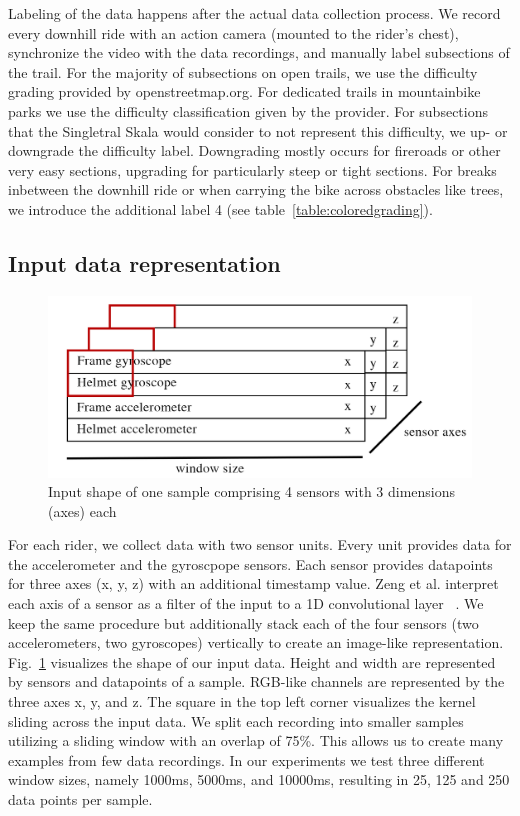 \documentclass[runningheads]{llncs}
\begin{document}
Labeling of the data happens after the actual data collection process.
We record every downhill ride with an action camera (mounted to the rider's chest), synchronize the video with the data recordings, and manually label subsections of the trail.
For the majority of subsections on open trails, we use the difficulty grading provided by openstreetmap.org.
For dedicated trails in mountainbike parks we use the difficulty classification given by the provider.
For subsections that the Singletral Skala would consider to not represent this difficulty, we up- or downgrade the difficulty label.
Downgrading mostly occurs for fireroads or other very easy sections, upgrading for particularly steep or tight sections.
For breaks inbetween the downhill ride or when carrying the bike across obstacles like trees, we introduce the additional label 4 (see table~\ref{table:coloredgrading}).

\subsection{Input data representation}

\begin{figure}
\includegraphics[width=\textwidth]{input_shape.png}
\caption{Input shape of one sample comprising 4 sensors with 3 dimensions (axes) each}
\label{fig2}	
\end{figure}

For each rider, we collect data with two sensor units.
Every unit provides data for the accelerometer and the gyroscpope sensors.
Each sensor provides datapoints for three axes (x, y, z) with an additional timestamp value.
Zeng et al. interpret each axis of a sensor as a filter of the input to a 1D convolutional layer ~\cite{zeng2014convolutional}.
We keep the same procedure but additionally stack each of the four sensors (two accelerometers, two gyroscopes) vertically to create an image-like representation.
Fig.~\ref{fig2} visualizes the shape of our input data.
Height and width are represented by sensors and datapoints of a sample.
RGB-like channels are represented by the three axes x, y, and z.
The square in the top left corner visualizes the kernel sliding across the input data.
We split each recording into smaller samples utilizing a sliding window with an overlap of 75\%.
This allows us to create many examples from few data recordings.
In our experiments we test three different window sizes, namely 1000ms, 5000ms, and 10000ms, resulting in 25, 125 and 250 data points per sample.
\end{document}
